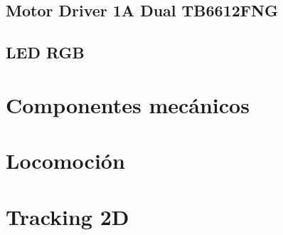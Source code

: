 \subsection{Motor Driver 1A Dual TB6612FNG}

\subsection{LED RGB}

\section{Componentes mecánicos}


\section{Locomoción}


\section{Tracking 2D}